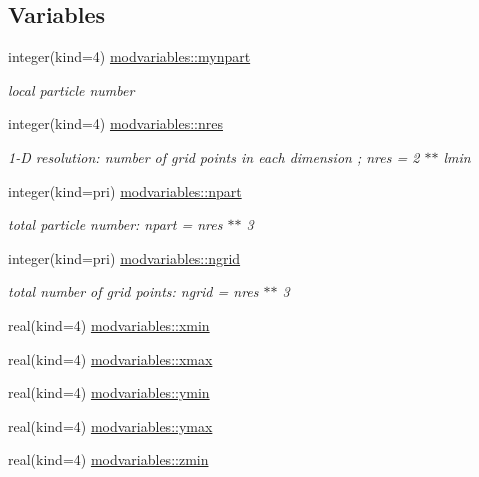 \subsection*{Variables}
\begin{DoxyCompactItemize}
\item 
integer(kind=4) \hyperlink{namespacemodvariables_a6b2f4aac9da282a26d2ff36628fa0c7b}{modvariables\+::mynpart}
\begin{DoxyCompactList}\small\item\em local particle number \end{DoxyCompactList}\item 
integer(kind=4) \hyperlink{namespacemodvariables_aa678ff0ebe26f3b0510eba5a59a69e61}{modvariables\+::nres}
\begin{DoxyCompactList}\small\item\em 1-\/D resolution\+: number of grid points in each dimension ; nres = 2 $\ast$$\ast$ lmin \end{DoxyCompactList}\item 
integer(kind=pri) \hyperlink{namespacemodvariables_a8c3df9e10fb71cff536986d2a33fa2c7}{modvariables\+::npart}
\begin{DoxyCompactList}\small\item\em total particle number\+: npart = nres $\ast$$\ast$ 3 \end{DoxyCompactList}\item 
integer(kind=pri) \hyperlink{namespacemodvariables_afeecc1a4b626f4eb8e48767dbf41d0a2}{modvariables\+::ngrid}
\begin{DoxyCompactList}\small\item\em total number of grid points\+: ngrid = nres $\ast$$\ast$ 3 \end{DoxyCompactList}\item 
real(kind=4) \hyperlink{namespacemodvariables_aaa639d561a94ae000546755b6863b6be}{modvariables\+::xmin}
\item 
real(kind=4) \hyperlink{namespacemodvariables_a9112a5edebd73d310c4594fca429a757}{modvariables\+::xmax}
\item 
real(kind=4) \hyperlink{namespacemodvariables_af09b8e9f670d2074a46c55ed90661609}{modvariables\+::ymin}
\item 
real(kind=4) \hyperlink{namespacemodvariables_aa84922c68231d1c3496d3a7d210a62e7}{modvariables\+::ymax}
\item 
real(kind=4) \hyperlink{namespacemodvariables_aa88314239681eb1c24673391f4612eb3}{modvariables\+::zmin}
\item 

\end{DoxyCompactItemize}
